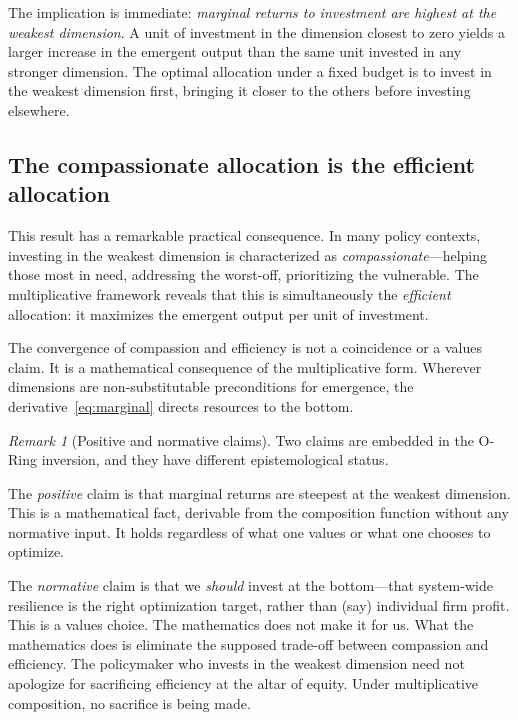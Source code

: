 \documentclass[12pt, a4paper]{article}
\theoremstyle{definition}
\theoremstyle{remark}
\newtheorem{remark}[theorem]{Remark}
\begin{document}
The implication is immediate: \textit{marginal returns to investment are highest at the weakest dimension}. A unit of investment in the dimension closest to zero yields a larger increase in the emergent output than the same unit invested in any stronger dimension. The optimal allocation under a fixed budget is to invest in the weakest dimension first, bringing it closer to the others before investing elsewhere.

\subsection{The compassionate allocation is the efficient allocation}

This result has a remarkable practical consequence. In many policy contexts, investing in the weakest dimension is characterized as \textit{compassionate}---helping those most in need, addressing the worst-off, prioritizing the vulnerable. The multiplicative framework reveals that this is simultaneously the \textit{efficient} allocation: it maximizes the emergent output per unit of investment.

The convergence of compassion and efficiency is not a coincidence or a values claim. It is a mathematical consequence of the multiplicative form. Wherever dimensions are non-substitutable preconditions for emergence, the derivative~\eqref{eq:marginal} directs resources to the bottom.

\begin{remark}[Positive and normative claims]
Two claims are embedded in the O-Ring inversion, and they have different epistemological status.

The \textit{positive} claim is that marginal returns are steepest at the weakest dimension. This is a mathematical fact, derivable from the composition function without any normative input. It holds regardless of what one values or what one chooses to optimize.

The \textit{normative} claim is that we \textit{should} invest at the bottom---that system-wide resilience is the right optimization target, rather than (say) individual firm profit. This is a values choice. The mathematics does not make it for us. What the mathematics does is eliminate the supposed trade-off between compassion and efficiency. The policymaker who invests in the weakest dimension need not apologize for sacrificing efficiency at the altar of equity. Under multiplicative composition, no sacrifice is being made.
\end{remark}
\end{document}
